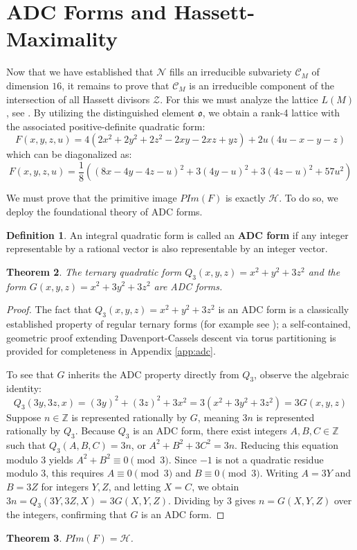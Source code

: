 \documentclass[11pt,letterpaper]{amsart} %
\newtheorem{theorem}{Theorem}[section]
\theoremstyle{definition}
\newtheorem{definition}[theorem]{Definition}
\begin{document}
\section{ADC Forms and Hassett-Maximality}
Now that we have established that $\mathcal{N}$ fills an irreducible subvariety $\mathcal{C}_M$ of dimension $16$, it remains to prove that $\mathcal{C}_M$ is an irreducible component of the intersection of all Hassett divisors $\mathcal{Z}$.  For this we must analyze the lattice $L(M)$, see \cite[Definition 3.2]{GalNuer}. %
By utilizing the distinguished element $\mathfrak{o}$, we obtain a rank-4 lattice with the associated positive-definite quadratic form: 
$$F(x,y,z,u) = 4(2x^2+2y^2+2z^2-2xy-2xz+yz)+2u(4u-x-y-z)$$ %
which can be diagonalized as: 
$$F(x,y,z,u) = \frac{1}{8}((8x-4y-4z-u)^2+3(4y-u)^2+3(4z-u)^2+57u^2)$$ %

We must prove that the primitive image $PIm(F)$ is exactly $\mathcal{H}$. %
To do so, we deploy the foundational theory of ADC forms. 

\begin{definition}
An integral quadratic form is called an \textbf{ADC form} if any integer representable by a rational vector is also representable by an integer vector. %
\end{definition}

\begin{theorem}\label{Thm:Q and G are ADC}
The ternary quadratic form $Q_3(x,y,z) = x^2+y^2+3z^2$ and the form $G(x,y,z) = x^2+3y^2+3z^2$ are ADC forms. %
\end{theorem}

\begin{proof}
The fact that $Q_3(x,y,z) = x^2+y^2+3z^2$ is an ADC form is a classically established property of regular ternary forms (for example see \cite[Table 2]{ClarkJagy}); a self-contained, geometric proof extending Davenport-Cassels descent via torus partitioning is provided for completeness in Appendix \ref{app:adc}. 

To see that $G$ inherits the ADC property directly from $Q_3$, observe the algebraic identity:
$$Q_3(3y,3z,x) = (3y)^2 + (3z)^2 + 3x^2 = 3(x^2+3y^2+3z^2) = 3G(x,y,z)$$
Suppose $n \in \mathbb{Z}$ is represented rationally by $G$, meaning $3n$ is represented rationally by $Q_3$. Because $Q_3$ is an ADC form, there exist integers $A,B,C \in \mathbb{Z}$ such that $Q_3(A,B,C) = 3n$, or $A^2+B^2+3C^2 = 3n$. Reducing this equation modulo 3 yields $A^2+B^2 \equiv 0 \pmod 3$. Since $-1$ is not a quadratic residue modulo 3, this requires $A \equiv 0 \pmod 3$ and $B \equiv 0 \pmod 3$. Writing $A=3Y$ and $B=3Z$ for integers $Y,Z$, and letting $X=C$, we obtain $3n = Q_3(3Y,3Z,X) = 3G(X,Y,Z)$. Dividing by 3 gives $n = G(X,Y,Z)$ over the integers, confirming that $G$ is an ADC form. %
\end{proof}
\begin{theorem}
$PIm(F) = \mathcal{H}$. %
\end{theorem}
\end{document}
